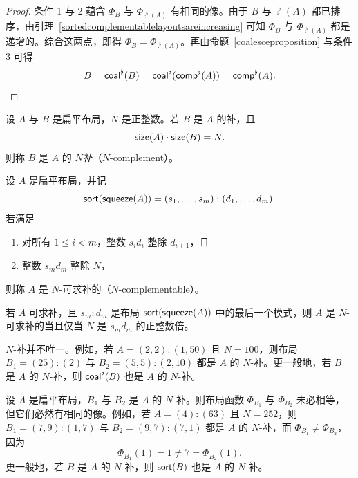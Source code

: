 \begin{proof}
    条件 1 与 2 蕴含 $\Phi_{B}$ 与 $\Phi_{\comp^\flat(A)}$ 有相同的像。由于 $B$ 与 $\comp^\flat(A)$ 都已排序，由引理~\ref{sortedcomplementablelayoutsareincreasing} 可知 $\Phi_{B}$ 与 $\Phi_{\comp^\flat(A)}$ 都是递增的。综合这两点，即得 $\Phi_{B} = \Phi_{\comp^\flat(A)}$。再由命题~\ref{coalesceproposition} 与条件 3 可得
    \[
    B = \mathsf{coal}^\flat(B) = \mathsf{coal}^\flat(\mathsf{comp}^\flat(A)) = \mathsf{comp}^\flat(A).
    \]
\end{proof}

\begin{definition}\label{definitionofNcomplementable}
    设 $A$ 与 $B$ 是扁平布局，$N$ 是正整数。若 $B$ 是 $A$ 的补，且
    \[
    \mathsf{size}(A)\cdot \mathsf{size}(B) = N.
    \]
    则称 $B$ 是 $A$ 的 $N${\it 补}（$N$-complement）。
\end{definition}


\begin{definition}
    设 $A$ 是扁平布局，并记
    \[
    \mathsf{sort}(\mathsf{squeeze}(A)) = (s_1,\dots,s_m):(d_1,\dots,d_m).
    \]
    若满足
    \begin{enumerate}
    \item 对所有 $1 \leq i < m$，整数 $s_id_i$ 整除 $d_{i+1}$，且
    \item 整数 $s_md_m$ 整除 $N$，
    \end{enumerate}
    则称 $A$ 是 $N$-可求补的（$N$-complementable）。
\end{definition}


\begin{observation}
若 $A$ 可求补，且 $s_m:d_m$ 是布局 $\mathsf{sort}(\mathsf{squeeze}(A))$ 中的最后一个模式，则 $A$ 是 $N$-可求补的当且仅当 $N$ 是 $s_md_m$ 的正整数倍。
\end{observation}

\begin{observation}
    $N$-补并不唯一。例如，若 $A = (2,2):(1,50)$ 且 $N = 100$，则布局 $B_1 = (25):(2)$ 与 $B_2 = (5,5):(2,10)$ 都是 $A$ 的 $N$-补。更一般地，若 $B$ 是 $A$ 的 $N$-补，则 $\mathsf{coal}^\flat(B)$ 也是 $A$ 的 $N$-补。
\end{observation}

\begin{remark}
    设 $A$ 是扁平布局，$B_1$ 与 $B_2$ 是 $A$ 的 $N$-补。则布局函数 $\Phi_{B_1}$ 与 $\Phi_{B_2}$ 未必相等，但它们必然有相同的像。例如，若 $A = (4):(63)$ 且 $N = 252$，则 $B_1 = (7,9):(1,7)$ 与 $B_2 = (9,7):(7,1)$ 都是 $A$ 的 $N$-补，而 $\Phi_{B_1} \neq \Phi_{B_2}$，因为
    \[
    \Phi_{B_1}(1) = 1 \neq 7= \Phi_{B_2}(1).
    \]
    更一般地，若 $B$ 是 $A$ 的 $N$-补，则 $\mathsf{sort}(B)$ 也是 $A$ 的 $N$-补。
\end{remark}


